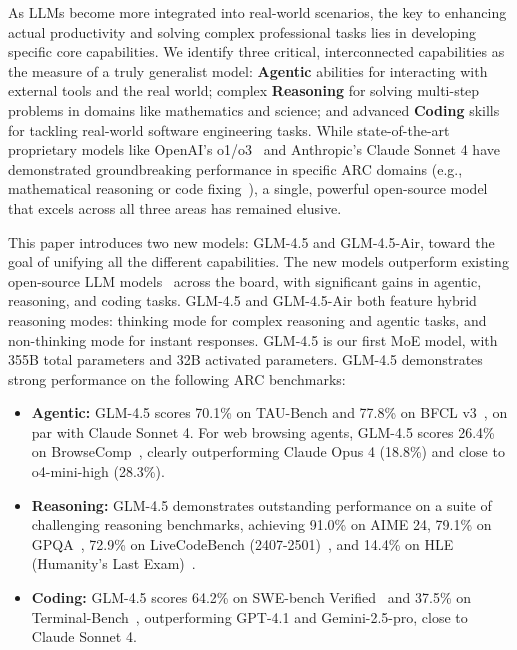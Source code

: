 \documentclass{article}
\theoremstyle{definition}
\begin{document}
As LLMs become more integrated into real-world scenarios, the key to enhancing actual productivity and solving complex professional tasks lies in developing specific core capabilities.
We identify three critical, interconnected capabilities as the measure of a truly generalist model: \textbf{Agentic} abilities for interacting with external tools and the real world; complex \textbf{Reasoning} for solving multi-step problems in domains like mathematics and science; and advanced \textbf{Coding} skills for tackling real-world software engineering tasks. While state-of-the-art proprietary models like OpenAI's o1/o3~\cite{jaech2024openai} and Anthropic's Claude Sonnet 4 have demonstrated groundbreaking performance in specific ARC domains (e.g., mathematical reasoning or code fixing~\cite{jimenez2023swe}), a single, powerful open-source model that excels across all three areas has remained elusive.

This paper introduces two new models: GLM-4.5 and GLM-4.5-Air, toward the goal of unifying all the different capabilities.
The new models outperform existing open-source LLM models~\cite{guo2025deepseek,team2025kimi,yang2025qwen3} across the board, with significant gains in agentic, reasoning, and coding tasks. GLM-4.5 and GLM-4.5-Air both feature hybrid reasoning modes: thinking mode for complex reasoning and agentic tasks, and non-thinking mode for instant responses. GLM-4.5 is our first MoE model, with 355B total parameters and 32B activated parameters. GLM-4.5 demonstrates strong performance on the following ARC benchmarks:

\begin{itemize}[leftmargin=*,itemsep=0pt,parsep=0.4em,topsep=0.0em,partopsep=0.0em]
     \item \textbf{Agentic:} GLM-4.5 scores 70.1\% on TAU-Bench and 77.8\% on BFCL v3~\cite{patil2025bfcl}, on par with Claude Sonnet 4. For web browsing agents, GLM-4.5 scores 26.4\% on BrowseComp~\cite{wei2025browsecomp}, clearly outperforming Claude Opus 4 (18.8\%) and close to o4-mini-high (28.3\%).
     
    \item \textbf{Reasoning:} GLM-4.5 demonstrates outstanding performance on a suite of challenging reasoning benchmarks, achieving 91.0\% on AIME 24, 79.1\% on GPQA~\cite{rein2024gpqa}, 72.9\% on LiveCodeBench (2407-2501)~\cite{jainlivecodebench}, and 14.4\% on HLE (Humanity's Last Exam)~\cite{phan2025humanity}.
    
    \item \textbf{Coding:} GLM-4.5 scores 64.2\% on SWE-bench Verified~\cite{jimenez2023swe} and 37.5\% on Terminal-Bench~\cite{tbench_2025}, outperforming GPT-4.1 and Gemini-2.5-pro, close to Claude Sonnet 4.
\end{itemize}
\end{document}
